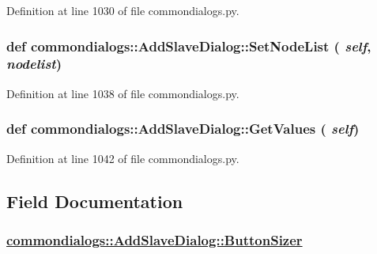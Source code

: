 Definition at line 1030 of file commondialogs.py.\hypertarget{classcommondialogs_1_1AddSlaveDialog_70e8955dbb57253e53d28f24a7f28da4}{
\subsubsection[SetNodeList]{\setlength{\rightskip}{0pt plus 5cm}def commondialogs::Add\-Slave\-Dialog::Set\-Node\-List ( {\em self},  {\em nodelist})}}
\label{classcommondialogs_1_1AddSlaveDialog_70e8955dbb57253e53d28f24a7f28da4}




Definition at line 1038 of file commondialogs.py.\hypertarget{classcommondialogs_1_1AddSlaveDialog_0211d3e7bd98931e9426f587b7956d5b}{
\subsubsection[GetValues]{\setlength{\rightskip}{0pt plus 5cm}def commondialogs::Add\-Slave\-Dialog::Get\-Values ( {\em self})}}
\label{classcommondialogs_1_1AddSlaveDialog_0211d3e7bd98931e9426f587b7956d5b}




Definition at line 1042 of file commondialogs.py.

\subsection{Field Documentation}
\hypertarget{classcommondialogs_1_1AddSlaveDialog_547ce8f618541a9a84f69d2c64c2f113}{
\subsubsection[ButtonSizer]{\setlength{\rightskip}{0pt plus 5cm}\hyperlink{classcommondialogs_1_1AddSlaveDialog_547ce8f618541a9a84f69d2c64c2f113}{commondialogs::Add\-Slave\-Dialog::Button\-Sizer}}}
\label{classcommondialogs_1_1AddSlaveDialog_547ce8f618541a9a84f69d2c64c2f113}




